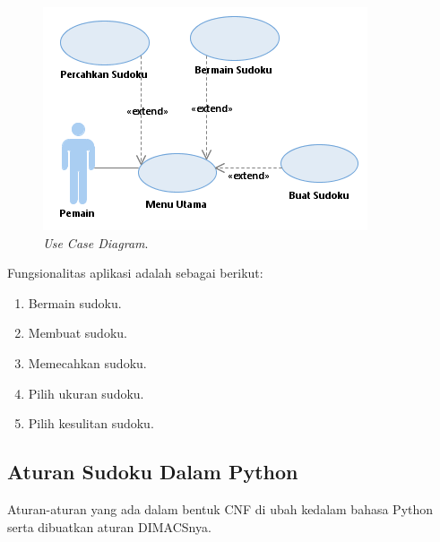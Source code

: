 \begin{figure}[H]
	\begin{centering}
		\includegraphics[scale=1]{gambar/useCase}
		
		\caption{\textit{Use Case Diagram}.}
	\end{centering}
\end{figure}

Fungsionalitas aplikasi adalah sebagai berikut:
\begin{enumerate}
	\item Bermain sudoku.
	\item Membuat sudoku.
	\item Memecahkan sudoku.
	\item Pilih ukuran sudoku.
	\item Pilih kesulitan sudoku.
\end{enumerate}

\subsection{Aturan Sudoku Dalam Python}

Aturan-aturan yang ada dalam bentuk CNF di ubah kedalam bahasa Python serta dibuatkan aturan DIMACSnya.

